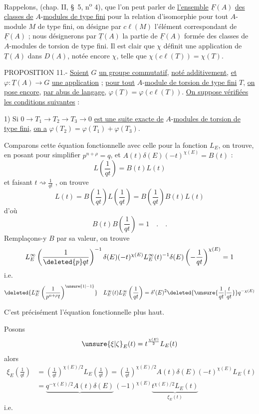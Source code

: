 Rappelons, (chap. II, \S~5, n\textsuperscript{o} 4), que l'on peut parler de \uline{l'ensemble} $\underline F(A)$ \uline{des classes de} $A$-\uline{modules de type fini} pour la relation d'isomorphie pour tout $A$-module $M$ de type fini, on désigne par $c\ell(M)$ l'élément correspondant de $\underline F(A)$ ; nous désignerons par $\underline T(A)$ la partie de $\underline F(A)$ formée des classes de $A$-modules de torsion de type fini. Il est clair que $\chi$ définit une application de $\underline T(A)$ dans $D(A)$, notée encore $\chi$, telle que $\chi(c\ell(T))=\chi(T)$.

PROPOSITION 11.- \uline{Soient} $G$ \uline{un groupe commutatif}, \uline{noté additivement}, \uline{et} $\varphi:\underline T(A)\longrightarrow G$ \uline{une application} ; \uline{pour tout} $A$-\uline{module de torsion de type fini} $T$, \uline{on pose encore}, \uline{par abus de langage}, $\varphi(T)=\varphi(c\ell(T))$. \uline{On suppose vérifiées les conditions suivantes} :

1) Si $0\longrightarrow T_1\longrightarrow T_2\longrightarrow T_3\longrightarrow 0$ \uline{est une suite exacte de} $A$-\uline{modules de torsion de type fini}, \uline{on a} $\varphi(T_2)=\varphi(T_1)+\varphi(T_3)$.

Comparons cette équation fonctionnelle avec celle pour la fonction $L_E$, on trouve, en  posant pour simplifier $p^{n+\rho}=q$, et $A(t)\delta(E)(-t)^{\chi(E)}=B(t)$ :
\[
 L\left(\frac{1}{qt}\right)=B(t)L(t)
\]
et faisant $t\rightsquigarrow\frac{1}{qt}$ , on trouve
\[
 L(t)=B\left(\frac{1}{qt}\right)L\left(\frac{1}{qt}\right)
      =B\left(\frac{1}{qt}\right)B(t)L(t)
\]
d'où
\[
 B(t)B\left(\frac{1}{qt}\right)=1\quad .\quad .
\]
Remplaçons-y $B$ par sa valeur, on trouve
\[
 L_E^\infty\left(\frac{1}{\deleted{p}qt}\right)^{-1}
 \delta(E)(-t)^{\chi(E)}L_E^\infty(t)^{-1}\delta(E)
 \left(-\frac{1}{qt}\right)^{\chi(E)}=1
\]
i.e.
\[
 \deleted{L_E^\infty\left(\frac{1}{p^{n+\rho}t}\right)^{\unsure{1|-1}}}
 \quad L_E^\infty(t)L_E^\infty\left(\frac{1}{qt}\right)
 =\delta'(E)^2\deleted{\unsure{\frac{1}{qt}|\frac{t}{qt}}}q^{-\chi(E)}
\]

C'est précisément l'équation fonctionnelle  plus haut.

Posons
\[
 \unsure{\xi|\zeta}_E(t)=t^{\frac{\chi(E)}{2}}L_E(t)
\]
alors
\[
 \begin{aligned}
 \xi_E\left(\frac{1}{qt}\right)&=\left(\frac{1}{qt}\right)^{\chi(E)/2}
 L_E\left(\frac{1}{qt}\right)=\left(\frac{1}{qt}\right)^{\chi(E)/2}
 A(t)\delta(E)(-t)^{\chi(E)}L_E(t)\\
 &=\underbrace{q^{-\chi(E)/2}A(t)\delta(E)}\,(-1)^{\chi(E)}
 \underbrace{t^{\chi(E)/2}L_E(t)}_{\xi_E(t)}
 \end{aligned}
\]
i.e.

